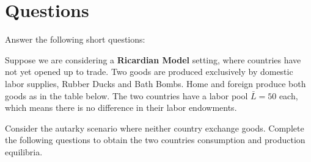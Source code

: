 \documentclass[12pt]{exam}
\begin{document}
\section*{Questions}
\begin{questions}

\question[12]
Answer the following short questions:


\newpage 

\question[18]
Suppose we are considering a \textbf{Ricardian Model} setting, where countries have not yet opened up to trade. 
Two goods are produced exclusively by domestic labor supplies, Rubber Ducks and Bath Bombs. 
Home and foreign produce both goods as in the table below. 
The two countries have a labor pool $\bar{L} = 50$ each, which means there is no difference in their labor endowments. 



Consider the autarky scenario where neither country exchange goods. 
Complete the following questions to obtain the two countries consumption and production equilibria. 

\end{questions}
\end{document}
